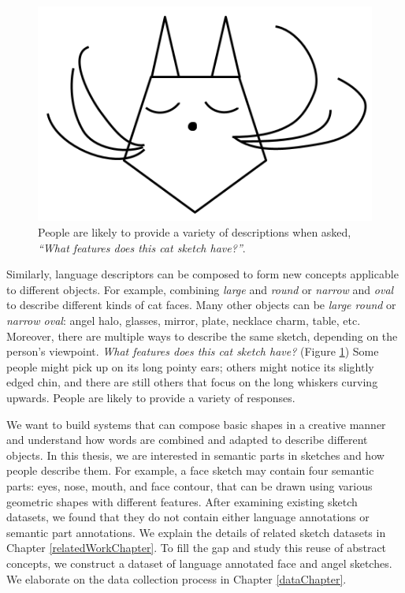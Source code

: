 \begin{figure}[!htb]
\centering
\includegraphics[width=.3\linewidth]{introduction/catFace.png}  
\caption{People are likely to provide a variety of descriptions when asked, \textit{``What features does this cat sketch have?''}.}
\label{introduction.cat.face}
\end{figure}

Similarly, language descriptors can be composed to form new concepts applicable to different objects. For example, combining \textit{large} and \textit{round} or \textit{narrow} and \textit{oval} to describe different kinds of cat faces.
Many other objects can be \textit{large round} or \textit{narrow oval}: angel halo, glasses, mirror, plate, necklace charm, table, etc.
Moreover, there are multiple ways to describe the same sketch, depending on the person's viewpoint. \textit{What features does this cat sketch have?} (Figure \ref{introduction.cat.face}) Some people might pick up on its long pointy ears; others might notice its slightly edged chin, and there are still others that focus on the long whiskers curving upwards. People are likely to provide a variety of responses.  

We want to build systems that can compose basic shapes in a creative manner and understand how words are combined and adapted to describe different objects.  
In this thesis, we are interested in semantic parts in sketches and how people describe them. For example, a face sketch may contain four semantic parts: eyes, nose, mouth, and face contour, that can be drawn using various geometric shapes with different features. After examining existing sketch datasets, we found that they do not contain either language annotations or semantic part annotations. We explain the details of related sketch datasets in Chapter \ref{relatedWorkChapter}. To fill the gap and study this reuse of abstract concepts, we construct a dataset of language annotated face and angel sketches. We elaborate on the data collection process in Chapter \ref{dataChapter}.  

